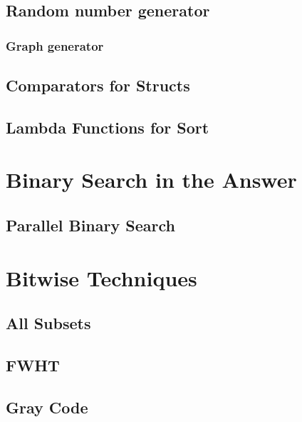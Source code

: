 \documentclass[10pt,letterpaper,landscape,twocolumn]{article}
\begin{document}
\subsection{Random number generator}



\subsubsection{Graph generator}


\subsection{Comparators for Structs}


\subsection{Lambda Functions for Sort}


\section{Binary Search in the Answer}

\subsection{Parallel Binary Search}


\section{Bitwise Techniques}
\subsection{All Subsets}

\subsection{FWHT}

\subsection{Gray Code}

\end{document}
